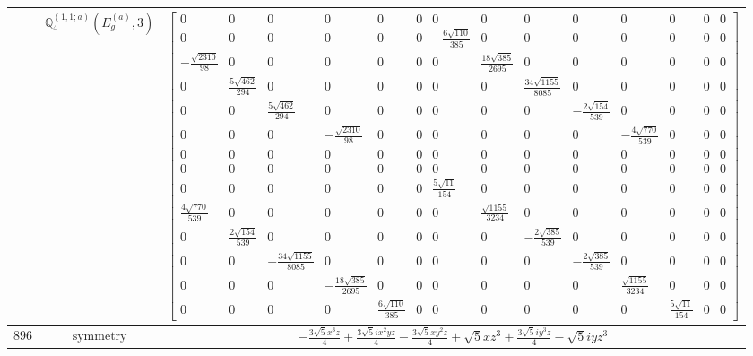 \documentclass[fleqn,8pt,landscape]{jsarticle}
\begin{document}
\begin{longtable}{ccc}
$  $ & $ \mathbb{Q}_{4}^{(1,1;a)}(E_{g}^{(a)},3) $ & $ \begin{bmatrix} 0 & 0 & 0 & 0 & 0 & 0 & 0 & 0 & 0 & 0 & 0 & 0 & 0 & 0 \\ 0 & 0 & 0 & 0 & 0 & 0 & - \frac{6 \sqrt{110}}{385} & 0 & 0 & 0 & 0 & 0 & 0 & 0 \\ - \frac{\sqrt{2310}}{98} & 0 & 0 & 0 & 0 & 0 & 0 & \frac{18 \sqrt{385}}{2695} & 0 & 0 & 0 & 0 & 0 & 0 \\ 0 & \frac{5 \sqrt{462}}{294} & 0 & 0 & 0 & 0 & 0 & 0 & \frac{34 \sqrt{1155}}{8085} & 0 & 0 & 0 & 0 & 0 \\ 0 & 0 & \frac{5 \sqrt{462}}{294} & 0 & 0 & 0 & 0 & 0 & 0 & - \frac{2 \sqrt{154}}{539} & 0 & 0 & 0 & 0 \\ 0 & 0 & 0 & - \frac{\sqrt{2310}}{98} & 0 & 0 & 0 & 0 & 0 & 0 & - \frac{4 \sqrt{770}}{539} & 0 & 0 & 0 \\ 0 & 0 & 0 & 0 & 0 & 0 & 0 & 0 & 0 & 0 & 0 & 0 & 0 & 0 \\ 0 & 0 & 0 & 0 & 0 & 0 & 0 & 0 & 0 & 0 & 0 & 0 & 0 & 0 \\ 0 & 0 & 0 & 0 & 0 & 0 & \frac{5 \sqrt{11}}{154} & 0 & 0 & 0 & 0 & 0 & 0 & 0 \\ \frac{4 \sqrt{770}}{539} & 0 & 0 & 0 & 0 & 0 & 0 & \frac{\sqrt{1155}}{3234} & 0 & 0 & 0 & 0 & 0 & 0 \\ 0 & \frac{2 \sqrt{154}}{539} & 0 & 0 & 0 & 0 & 0 & 0 & - \frac{2 \sqrt{385}}{539} & 0 & 0 & 0 & 0 & 0 \\ 0 & 0 & - \frac{34 \sqrt{1155}}{8085} & 0 & 0 & 0 & 0 & 0 & 0 & - \frac{2 \sqrt{385}}{539} & 0 & 0 & 0 & 0 \\ 0 & 0 & 0 & - \frac{18 \sqrt{385}}{2695} & 0 & 0 & 0 & 0 & 0 & 0 & \frac{\sqrt{1155}}{3234} & 0 & 0 & 0 \\ 0 & 0 & 0 & 0 & \frac{6 \sqrt{110}}{385} & 0 & 0 & 0 & 0 & 0 & 0 & \frac{5 \sqrt{11}}{154} & 0 & 0 \end{bmatrix} $ \\ \hline
$ 896 $ & $ \text{symmetry} $ & $ - \frac{3 \sqrt{5} x^{3} z}{4} + \frac{3 \sqrt{5} i x^{2} y z}{4} - \frac{3 \sqrt{5} x y^{2} z}{4} + \sqrt{5} x z^{3} + \frac{3 \sqrt{5} i y^{3} z}{4} - \sqrt{5} i y z^{3} $ \\

\end{longtable}
\end{document}
